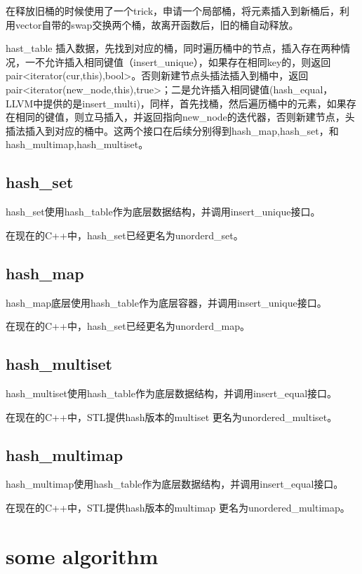 \documentclass[a4paper,fontset=mac]{ctexart}
\begin{document}
	 在释放旧桶的时候使用了一个{\color{red}trick}，申请一个局部桶，将元素插入到新桶后，利用vector自带的swap交换两个桶，故离开函数后，旧的桶自动释放。
	 
	 hast\_table 插入数据，先找到对应的桶，同时遍历桶中的节点，插入存在两种情况，一不允许插入相同键值（insert\_unique），如果存在相同key的，则返回pair<iterator(cur,this),bool>。否则新建节点头插法插入到桶中，返回pair<iterator(new\_node,this),true>；二是允许插入相同键值(hash\_equal，LLVM中提供的是insert\_multi)，同样，首先找桶，然后遍历桶中的元素，如果存在相同的键值，则立马插入，并返回指向new\_node的迭代器，否则新建节点，头插法插入到对应的桶中。这两个接口在后续分别得到hash\_map,hash\_set，和hash\_multimap,hash\_multiset。
	 
	 \subsection{hash\_set}
	 hash\_set使用hash\_table作为底层数据结构，并调用insert\_unique接口。
	 
	 在现在的C++中，hash\_set已经更名为unorderd\_set。
	 
	 \subsection{hash\_map}
	 hash\_map底层使用hash\_table作为底层容器，并调用insert\_unique接口。
	 
	 在现在的C++中，hash\_set已经更名为unorderd\_map。
	 
	 \subsection{hash\_multiset}
	 hash\_multiset使用hash\_table作为底层数据结构，并调用insert\_equal接口。
	 
	 在现在的C++中，STL提供hash版本的multiset 更名为unordered\_multiset。
	 
	 \subsection{hash\_multimap}
	 hash\_multimap使用hash\_table作为底层数据结构，并调用insert\_equal接口。
	 
	 在现在的C++中，STL提供hash版本的multimap 更名为unordered\_multimap。
	 
	 \section{some algorithm}
	 
\end{document}
